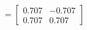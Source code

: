 \documentclass[preview]{standalone}
\begin{document}
\begin{align*}
= \begin{bmatrix} 0.707 & -0.707 \\ 0.707 & 0.707 \end{bmatrix}
\end{align*}
\end{document}
